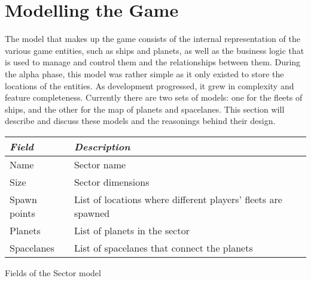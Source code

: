 \section{Modelling the Game}
\label{sec:model}

% 

The model that makes up the game consists of the internal representation of the various game entities, such as ships and planets, as well as the business logic that is used to manage and control them and the relationships between them. During the alpha phase, this model was rather simple as it only existed to store the locations of the entities. As development progressed, it grew in complexity and feature completeness. Currently there are two sets of models: one for the fleets of ships, and the other for the map of planets and spacelanes. This section will describe and discuss these models and the reasonings behind their design.

\begin{margintable}
    \begin{tabular}{p{4em} p{11em}}
    \toprule
    \emph{Field} & \emph{Description} \\
    \midrule

    Name & Sector name \\
    Size & Sector dimensions \\
    Spawn points & List of locations where different players' fleets are spawned \\
    Planets & List of planets in the sector \\
    Spacelanes & List of spacelanes that connect the planets \\

    \bottomrule
    \end{tabular}
    \vspace{1em}
    \caption{Fields of the Sector model}
    \label{tab:sector-fields}
\end{margintable}

